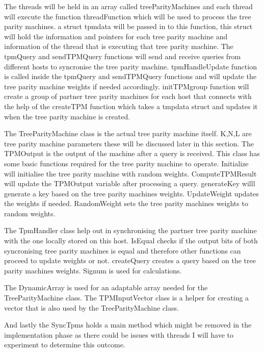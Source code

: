 The threads will be held in an array called treeParityMachines and each thread will execute the function threadFunction which will be used to process the tree parity machines. a struct tpmdata will be passed in to this function, this struct will hold the information and pointers for each tree parity machine and information of the thread that is executing that tree parity machine. The tpmQuery and sendTPMQuery functions will send and receive queries from different hosts to syncronise the tree parity machine. tpmHandleUpdate function is called inside the tpmQuery and sendTPMQuery functions and will update the tree parity machine weights if needed accordingly. initTPMgroup function will create a group of partner tree parity machines for each host that connects with the help of the createTPM function which takes a tmpdata struct and updates it when the tree parity machine is created.

The TreeParityMachine class is the actual tree parity machine itself. K,N,L are tree parity machine parameters these will be discussed later in this section. The TPMOutput is the output of the machine after a query is received. This class has some basic functions required for the tree parity machine to operate. Initialize will initialise the tree parity machine with random weights. ComputeTPMResult will update the TPMOutput variable after processing a query. generateKey willl generate a key based on the tree parity machines weights. UpdateWeight updates the weights if needed. RandomWeight sets the tree parity machines weights to random weights.

The TpmHandler class help out in synchronising the partner tree parity machine with the one locally stored on this host. IsEqual checks if the output bits of both syncronising tree parity machines is equal and therefore other functions can proceed to update weights or not. createQuery creates a query based on the tree parity machines weights. Signum is used for calculations. 

The DynamicArray is used for an adaptable array needed for the TreeParityMachine class. The TPMInputVector class is a helper for creating a vector that is also used by the TreeParityMachine class.

And lastly the SyncTpms holds a main method which might be removed in the implementation phase as there could be issues with threads I will have to experiment to determine this outcome.



